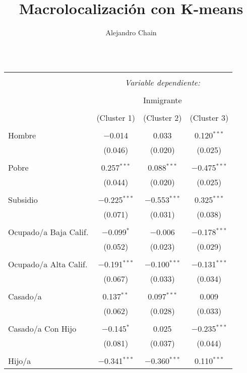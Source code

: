 \documentclass[10pt,a4paper]{book}
\author{Alejandro Chain}
\title{Macrolocalización con K-means}
\begin{document}
\maketitle

\begin{table}[!htbp] \centering 
  \caption{} 
  \label{} 
\small 
\begin{tabular}{@{\extracolsep{5pt}}lccc} 
\\[-1.8ex]\hline 
\hline \\[-1.8ex] 
 & \multicolumn{3}{c}{\textit{Variable dependiente:}} \\ 
\cline{2-4} 
\\[-1.8ex] & \multicolumn{3}{c}{Inmigrante} \\ 
\\[-1.8ex] & (Cluster 1) & (Cluster 2) & (Cluster 3)\\ 
\hline \\[-1.8ex] 
 Hombre & $-$0.014 & 0.033 & 0.120$^{***}$ \\ 
  & (0.046) & (0.020) & (0.025) \\ 
  & & & \\ 
 Pobre & 0.257$^{***}$ & 0.088$^{***}$ & $-$0.475$^{***}$ \\ 
  & (0.044) & (0.020) & (0.025) \\ 
  & & & \\ 
 Subsidio & $-$0.225$^{***}$ & $-$0.553$^{***}$ & 0.325$^{***}$ \\ 
  & (0.071) & (0.031) & (0.038) \\ 
  & & & \\ 
 Ocupado/a Baja Calif. & $-$0.099$^{*}$ & $-$0.006 & $-$0.178$^{***}$ \\ 
  & (0.052) & (0.023) & (0.029) \\ 
  & & & \\ 
 Ocupado/a Alta Calif. & $-$0.191$^{***}$ & $-$0.100$^{***}$ & $-$0.131$^{***}$ \\ 
  & (0.067) & (0.033) & (0.034) \\ 
  & & & \\ 
 Casado/a & 0.137$^{**}$ & 0.097$^{***}$ & 0.009 \\ 
  & (0.062) & (0.028) & (0.033) \\ 
  & & & \\ 
 Casado/a Con Hijo & $-$0.145$^{*}$ & 0.025 & $-$0.235$^{***}$ \\ 
  & (0.081) & (0.037) & (0.044) \\ 
  & & & \\ 
  Hijo/a & $-$0.341$^{***}$ & $-$0.360$^{***}$ & 0.110$^{***}$ \\ 

\end{tabular}
\end{table}
\end{document}
